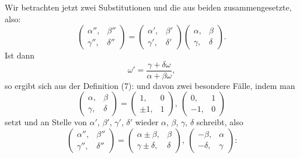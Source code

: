 
Wir betrachten jetzt zwei Substitutionen und die aus beiden zusammengesetzte, also:
\[
\begin{pmatrix}\alpha'', & \beta''\\ \gamma'', & \delta''\end{pmatrix} = \begin{pmatrix}\alpha', & \beta'\\ \gamma', & \delta'\end{pmatrix}\begin{pmatrix}\alpha, & \beta\\ \gamma, & \delta\end{pmatrix}.
\]
Ist dann
\[
\omega' = \frac{\gamma+\delta\omega}{\alpha+\beta\omega},
\]
so ergibt sich aus der Definition (7):
und davon zwei besondere Fälle, indem man
\[
\begin{pmatrix}\alpha, & \beta\\ \gamma, & \delta\end{pmatrix} = \begin{pmatrix}1, & 0\\ \pm 1, & 1\end{pmatrix}, \ \begin{pmatrix}0, & 1\\ -1, & 0\end{pmatrix}
\]
setzt und an Stelle von $\alpha'$, $\beta'$, $\gamma'$, $\delta'$ wieder $\alpha$, $\beta$, $\gamma$, $\delta$ schreibt, also
\[
\begin{pmatrix}\alpha'', & \beta''\\ \gamma'', & \delta''\end{pmatrix} = \begin{pmatrix}\alpha\pm\beta, & \beta\\ \gamma\pm\delta, & \delta\end{pmatrix}, \ \begin{pmatrix}-\beta, & \alpha\\ -\delta, & \gamma\end{pmatrix}\text{:}
\]
